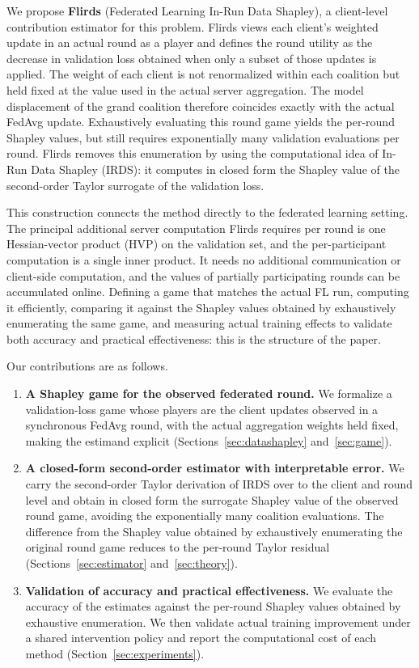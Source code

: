 \documentclass[letterpaper]{article} %
\theoremstyle{definition} %
\begin{document}
We propose \textbf{Flirds} (Federated Learning In-Run Data Shapley), a
client-level contribution estimator for this problem. Flirds views each
client's weighted update in an actual round as a player and defines the round
utility as the decrease in validation loss obtained when only a subset of
those updates is applied. The weight of each client is not renormalized
within each coalition but held fixed at the value used in the actual server
aggregation. The model displacement of the grand coalition therefore
coincides exactly with the actual FedAvg update. Exhaustively evaluating this
round game yields the per-round Shapley values, but still requires
exponentially many validation evaluations per round. Flirds removes this
enumeration by using the computational idea of In-Run Data Shapley (IRDS): it
computes in closed form the Shapley value of the second-order Taylor
surrogate of the validation loss.

This construction connects the method directly to the federated learning
setting. The principal additional server computation Flirds requires per
round is one Hessian-vector product (HVP) on the validation set, and the
per-participant computation is a single inner product. It needs no additional
communication or client-side computation, and the values of partially
participating rounds can be accumulated online. Defining a game that matches
the actual FL run, computing it efficiently, comparing it against the Shapley
values obtained by exhaustively enumerating the same game, and measuring
actual training effects to validate both accuracy and practical
effectiveness: this is the structure of the paper.

Our contributions are as follows.
\begin{enumerate}
    \item \textbf{A Shapley game for the observed federated round.} We
    formalize a validation-loss game whose players are the client updates
    observed in a synchronous FedAvg round, with the actual aggregation
    weights held fixed, making the estimand explicit
    (Sections~\ref{sec:datashapley} and~\ref{sec:game}).
    \item \textbf{A closed-form second-order estimator with interpretable
    error.} We carry the second-order Taylor derivation of IRDS over to the
    client and round level and obtain in closed form the surrogate Shapley
    value of the observed round game, avoiding the exponentially many
    coalition evaluations. The difference from the Shapley value obtained by
    exhaustively enumerating the original round game reduces to the per-round
    Taylor residual (Sections~\ref{sec:estimator} and~\ref{sec:theory}).
    \item \textbf{Validation of accuracy and practical effectiveness.} We
    evaluate the accuracy of the estimates against the per-round Shapley
    values obtained by exhaustive enumeration. We then validate actual
    training improvement under a shared intervention policy and report the
    computational cost of each method (Section~\ref{sec:experiments}).
\end{enumerate}
\end{document}
